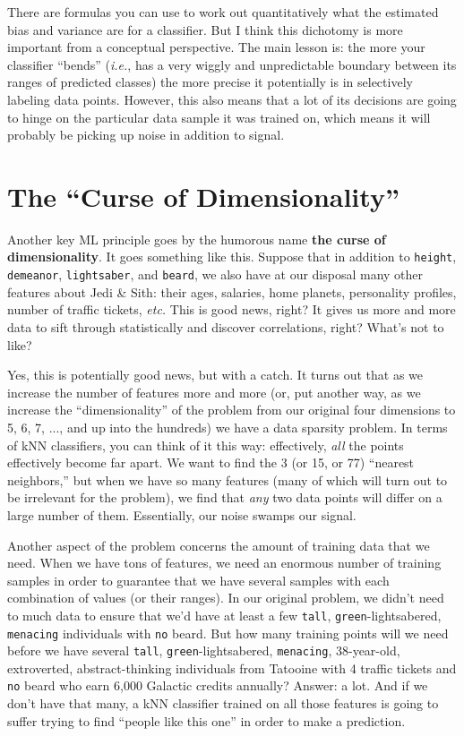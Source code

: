 There are formulas you can use to work out quantitatively what the estimated
bias and variance are for a classifier. But I think this dichotomy is more
important from a conceptual perspective. The main lesson is: the more your
classifier ``bends'' (\textit{i.e.}, has a very wiggly and unpredictable
boundary between its ranges of predicted classes) the more precise it
potentially is in selectively labeling data points. However, this also means
that a lot of its decisions are going to hinge on the particular data sample
it was trained on, which means it will probably be picking up noise in
addition to signal.


\section{The ``Curse of Dimensionality''}
\label{sec:curse}

Another key ML principle goes by the humorous name \textbf{the curse of
dimensionality}. It goes something like this. Suppose that in addition to
\texttt{height}, \texttt{demeanor}, \texttt{lightsaber}, and \texttt{beard},
we also have at our disposal many other features about Jedi \& Sith: their
ages, salaries, home planets, personality profiles, number of traffic tickets,
\textit{etc.} This is good news, right? It gives us more and more data to sift
through statistically and discover correlations, right? What's not to like?

Yes, this is potentially good news, but with a catch. It turns out that as we
increase the number of features more and more (or, put another way, as we
increase the ``dimensionality'' of the problem from our original four
dimensions to 5, 6, 7, ..., and up into the hundreds) we have a data sparsity
problem. In terms of kNN classifiers, you can think of it this way:
effectively, \textit{all} the points effectively become far apart. We want to
find the 3 (or 15, or 77) ``nearest neighbors,'' but when we have so many
features (many of which will turn out to be irrelevant for the problem), we
find that \textit{any} two data points will differ on a large number of them.
Essentially, our noise swamps our signal.

Another aspect of the problem concerns the amount of training data that we
need. When we have tons of features, we need an enormous number of training
samples in order to guarantee that we have several samples with each
combination of values (or their ranges). In our original problem, we didn't
need to much data to ensure that we'd have at least a few \texttt{tall},
\texttt{green}-lightsabered, \texttt{menacing} individuals with \texttt{no}
beard. But how many training points will we need before we have several
\texttt{tall}, \texttt{green}-lightsabered, \texttt{menacing}, 38-year-old,
extroverted, abstract-thinking individuals from Tatooine with 4 traffic
tickets and \texttt{no} beard who earn 6,000 Galactic credits annually?
Answer: a lot. And if we don't have that many, a kNN classifier trained on all
those features is going to suffer trying to find ``people like this one'' in
order to make a prediction.

